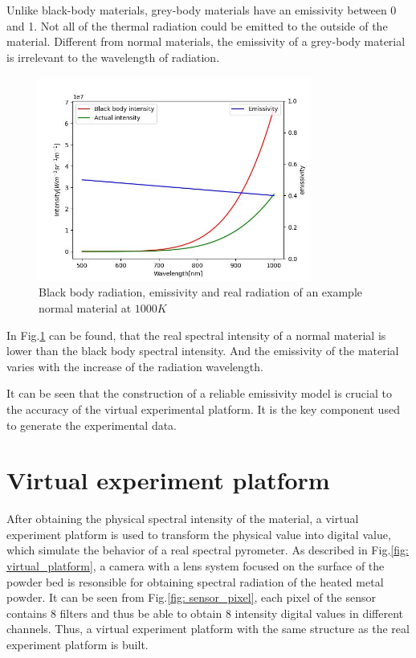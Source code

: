 Unlike black-body materials, grey-body materials have an emissivity between 0 and 1.
Not all of the thermal radiation could be emitted to the outside of the material. 
Different from normal materials, the emissivity of a grey-body material is irrelevant
to the wavelength of radiation.

\begin{figure}[htbp]
    \centering
    \includegraphics[width = 0.8\textwidth]{figures/real_radiation.jpg}
    \caption{Black body radiation, emissivity and real radiation of an example normal
    material at $1000K$}
    \label{fig: black_body_radiation}
\end{figure}


In Fig.\ref{fig: black_body_radiation} can be found, that the real spectral 
intensity of a normal material is lower than the black body spectral intensity.
And the emissivity of the material varies with the increase of the radiation 
wavelength.


It can be seen that the construction of a reliable emissivity model is crucial to 
the accuracy of the virtual experimental platform. It is the key component used to 
generate the experimental data.




\section{Virtual experiment platform}%
After obtaining the physical spectral intensity of the material, a virtual experiment platform
is used to transform the physical value into digital value, which simulate the 
behavior of a real spectral pyrometer. As described in Fig.\ref{fig: virtual_platform}, a 
camera with a lens system focused on the surface of the powder bed is resonsible 
for obtaining spectral radiation of the heated metal powder. It can be seen from 
Fig.\ref{fig: sensor_pixel}, each pixel of the sensor 
contains 8 filters and thus be able to obtain 8 intensity digital values in different 
channels. Thus, a virtual experiment platform with the same structure as the real 
experiment platform is built.

